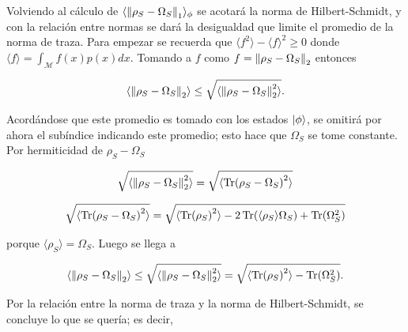 Volviendo al cálculo de $\langle \norm{\rho_{S} -\Omega_{S}}_{1} \rangle_{\phi}$ se acotará la norma de Hilbert-Schmidt, y con la relación entre normas se dará la desigualdad que limite el promedio de la norma de traza. Para empezar se recuerda que $ \langle f^{2} \rangle-\langle f \rangle^{2} \ge 0$ donde $\langle f \rangle = \int_{\mathcal{M}} f(x)p(x)dx$. Tomando a $f$ como $f= \norm{\rho_{S}-\Omega_{S}}_{2}$ entonces 

\begin{equation}
\langle \norm{ \rho_{S}-\Omega_{S} }_{2} \rangle \le \sqrt{ \langle \norm{ \rho_{S}-\Omega_{S} }_{2}^{2}\rangle}.
\end{equation}

Acordándose que este promedio es tomado con los estados $\ket{\phi}$, se omitirá por ahora el subíndice indicando este promedio; esto hace que $\Omega_{S}$ se tome constante. Por hermiticidad de $\rho_{S}-\Omega_{S}$ 

\begin{equation}
\sqrt{\langle \norm{ \rho_{S}-\Omega_{S} }_{2}^{2}\rangle} = \sqrt{\langle \Tr(\rho_{S}-\Omega_{S})^{2} \rangle}
\end{equation}

\begin{equation}
\sqrt{\langle \Tr( \rho_{S}-\Omega_{S})^{2} \rangle}= \sqrt{\langle \Tr(\rho_{S})^{2}\rangle -2 \Tr(\langle \rho_{S} \rangle \Omega_{S})+ \Tr(\Omega_{S}^{2}) }
\end{equation}

porque $\langle \rho_{S} \rangle=\Omega_{S}$. Luego se llega a

\begin{equation}
\langle \norm{ \rho_{S}-\Omega_{S} }_{2}\rangle \le \sqrt{\langle \norm{ \rho_{S}-\Omega_{S} }_{2}^{2}\rangle}= \sqrt{\langle \Tr(\rho_{S})^{2}\rangle - \Tr(\Omega_{S}^{2}) }.
\end{equation}

Por la relación entre la norma de traza y la norma de Hilbert-Schmidt, se concluye lo que se quería; es decir,

